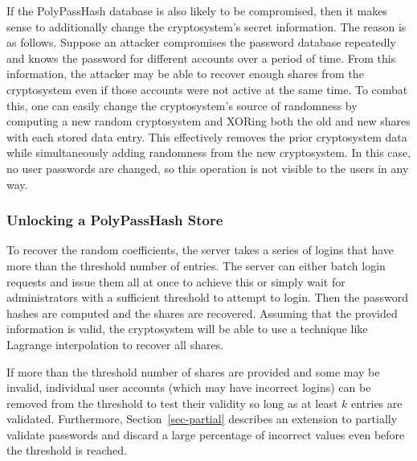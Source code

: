 If the PolyPassHash database is also likely to be compromised, then it 
makes sense to additionally change the cryptosystem's secret information.
The reason is as follows.   Suppose an attacker compromises the password 
database repeatedly and knows the password for different accounts over a 
period of time.   From this information, the attacker may be able to recover 
enough shares from the
cryptosystem even if those accounts were not active at the same time.   To
combat this, one can easily change the cryptosystem's source of randomness
by computing a new random cryptosystem and XORing both the old and new 
shares with each stored data entry.   This effectively removes the prior
cryptosystem data while simultaneously adding randomness from the new
cryptosystem.   In this case, no user passwords are changed, so this
operation is not visible to the users in any way.


\subsubsection{Unlocking a PolyPassHash Store}

To recover the random coefficients, the server takes a series of logins that 
have more than the threshold number of entries.   
The server can either batch login requests and issue them all at once to
achieve this or simply wait for administrators with a sufficient threshold to 
attempt to login.   Then the password hashes are computed and the shares
are recovered.   Assuming that the provided information is valid, the 
cryptosystem will be able to use a technique like Lagrange interpolation to
recover all shares.

If more than the threshold number of shares are provided and some may be
invalid, individual user accounts (which may have 
incorrect logins) can be removed from the threshold to test their validity
so long as at least $k$ entries are validated.   %
Furthermore, 
Section~\ref{sec-partial} describes an extension to partially validate 
passwords and discard a large percentage of incorrect values even before 
the threshold is reached.


